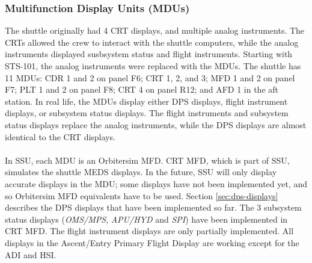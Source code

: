 \documentclass[Space_Shuttle_Ultra_Manual.tex]{subfiles}
\begin{document}
\begin{multicols*}{2}
\subsubsection{Multifunction Display Units (MDUs)}
The shuttle originally had 4 CRT displays, and multiple analog instruments.
The CRTs allowed the crew to interact with the shuttle computers, while the analog instruments displayed susbsystem status and flight instruments.
Starting with STS-101, the analog instruments were replaced with the MDUs.
The shuttle has 11 MDUs: CDR 1 and 2 on panel F6; CRT 1, 2, and 3; MFD 1 and 2 on panel F7; PLT 1 and 2 on panel F8; CRT 4 on panel R12; and AFD 1 in the aft station.
In real life, the MDUs display either DPS displays, flight instrument displays, or subsystem status displays.
The flight instruments and subsystem status displays replace the analog instruments, while the DPS displays are almost identical to the CRT displays.\\
\\
In SSU, each MDU is an Orbitersim MFD. CRT MFD, which is part of SSU, simulates the shuttle MEDS displays. In the future, SSU will only display accurate displays in the MDU; some displays have not been implemented yet, and so Orbitersim MFD equivalents have to be used.
Section \ref{sec:dps-displays} describes the DPS displays that have been implemented so far.
The 3 subsystem status displays (\textit{OMS/MPS}, \textit{APU/HYD} and \textit{SPI}) have been implemented in CRT MFD.
The flight instrument displays are only partially implemented. All displays in the Ascent/Entry Primary Flight Display are working except for the ADI and HSI.
\end{multicols*}
\end{document}
